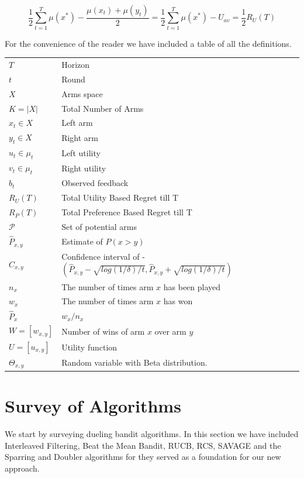 \documentclass{llncs}
\begin{document}
$$
\frac{1}{2} \sum_{t=1}^T \mu(x^*) -\frac{
	\mu(x_t)+\mu(y_t)}{2} =
\frac{1}{2} \sum_{t=1}^T \mu(x^*)- U_{av} = \frac{1}{2}R_U(T)$$

\newpage

For the convenience of the reader we have included a table of all the definitions. 
	\begin{table}[h]
		\begin{tabular}{ll}
 			$T$ & Horizon \\
 			$t$ &  Round \\
 			$X$ & Arms space \\
 			$K = |X|$ & Total Number of Arms\\
 			$x_t \in X$ & Left arm \\
 			$y_t \in X$ & Right arm \\
 			$u_t \in \mu_t$ & Left utility \\
 			$v_t \in \mu_t$ & Right utility \\
 			$b_t$ & Observed feedback \\
 			$R_U(T)$ & Total Utility Based Regret till T\\
			$R_P(T)$ & Total Preference Based Regret till T\\
 			$\mathcal{P}$ & Set of potential arms \\
 			$\hat{P}_{x, y}$ & Estimate of $P(x>y)$\\
 			$\hat{C}_{x, y}$ &   Confidence interval of - $(\hat{P}_{x, y} - \sqrt{log(1/\delta)/t},\hat{P}_{x, y} +\sqrt{log(1/\delta)/t})$\\
 			$n_x$ &   The number of times arm $x$ has been played\\
 			$w_x$ & The number of times arm $x$ has won\\
 			$\hat{P}_x  $ &  $ w_x / n_x $\\
 			$ W = [w_{x,y}]$ & Number of wins of arm $x$ over arm $y$\\
 			$U = [u_{x,y}]$ &  Utility function\\
 			$\Theta_{x,y}$ &   Random variable with Beta distribution.
		\end{tabular}
	\end{table}

\section{Survey of Algorithms}
	We start by surveying dueling bandit algorithms. In this section we have included Interleaved Filtering, Beat the Mean Bandit, RUCB, RCS, SAVAGE and the Sparring and Doubler algorithms for they served as a foundation for our new approach.
	
\end{document}
